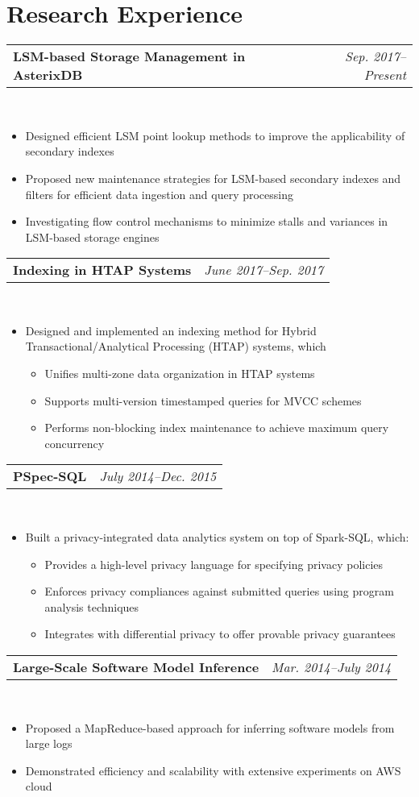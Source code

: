 \documentclass[11pt,a4paper,roman]{moderncv}        %
\makeatletter
\newcommand{\reduce}{\vspace{-0.115in}}
\newcommand{\cvexpr}[5][1em]{
  \begin{tabular*}{\maincolumnwidth}{l@{\extracolsep{\fill}}r}%
    {\textbf{#3}\ifthenelse{\equal{#4}{}}{}{, #4}} & {\itshape#2}%
  \end{tabular*}%
  \\
  \begin{minipage}{\maincolumnwidth}%
        #5%
  \end{minipage}%
  \par\addvspace{#1}
}
\makeatother
\begin{document}
\section{Research Experience}
\vspace{-0.05in}
\cvexpr{Sep. 2017--Present}{LSM-based Storage Management in AsterixDB}{University of California, Irvine}{
	\begin{itemize}
		\item Designed efficient LSM point lookup methods to improve the applicability of secondary indexes
		\item Proposed new maintenance strategies for LSM-based secondary indexes and filters for efficient data ingestion and query processing
		\item Investigating flow control mechanisms to minimize stalls and variances in LSM-based storage engines
	\end{itemize}
}
\reduce
\cvexpr{June 2017--Sep. 2017}{Indexing in HTAP Systems}{IBM Almaden Research Center}{
	\begin{itemize}
		\item Designed and implemented an indexing method for Hybrid Transactional/Analytical Processing (HTAP) systems, which
		\begin{itemize}
			\item Unifies multi-zone data organization in HTAP systems
			\item Supports multi-version timestamped queries for MVCC schemes
			\item Performs non-blocking index maintenance to achieve maximum query concurrency
		\end{itemize}
	\end{itemize}
}
\reduce
\cvexpr{July 2014--Dec. 2015}{PSpec-SQL}{Tsinghua University}{
\begin{itemize}
\item Built a privacy-integrated data analytics system on top of Spark-SQL, which:
	\begin{itemize}
		\item Provides a high-level privacy language for specifying privacy policies
		\item Enforces privacy compliances against submitted queries using program analysis techniques
		\item Integrates with differential privacy to offer provable privacy guarantees
	\end{itemize}
\end{itemize}
}
\reduce
\cvexpr{Mar. 2014--July 2014}{Large-Scale Software Model Inference}{Tsinghua University}{
\begin{itemize}
\item Proposed a MapReduce-based approach for inferring software models from large logs
\item Demonstrated efficiency and scalability with extensive experiments on AWS cloud
\end{itemize}
}
\reduce
\end{document}
